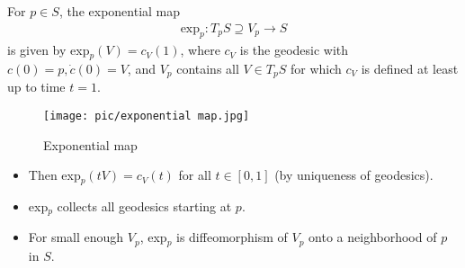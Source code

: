 \documentclass[10pt]{article}
\begin{document}
            \begin{definition}
                For $p\in S$, the exponential map
                \begin{equation*}
                    \begin{aligned}
                        \text{exp}_p: T_pS\supseteq V_p \rightarrow S
                    \end{aligned}
                \end{equation*}
                is given by exp$_p(V) = c_V(1)$, where $c_V$ is the geodesic with $c(0) = p, \dot{c}(0) = V$, and $V_p$ contains all $V\in T_pS$ for which $c_V$ is defined at least up to time $t = 1$.
            \end{definition}
            \begin{marginfigure}
                \vspace{-2.5cm}
                \begin{figure}[H]
                    \centering
                    \texttt{[image: pic/exponential map.jpg]}
                    \caption{Exponential map}
                \end{figure}
		\end{marginfigure}
            \begin{remark}
                \begin{itemize}
                    \item Then exp$_p(tV) = c_V(t)$ for all $t\in[0,1]$ (by uniqueness of geodesics).
                    \item exp$_p$ collects all geodesics starting at $p$.
                    \item For small enough $V_p$, exp$_p$ is diffeomorphism of $V_p$ onto a neighborhood of $p$ in $S$.
                \end{itemize}
            \end{remark}
\end{document}
